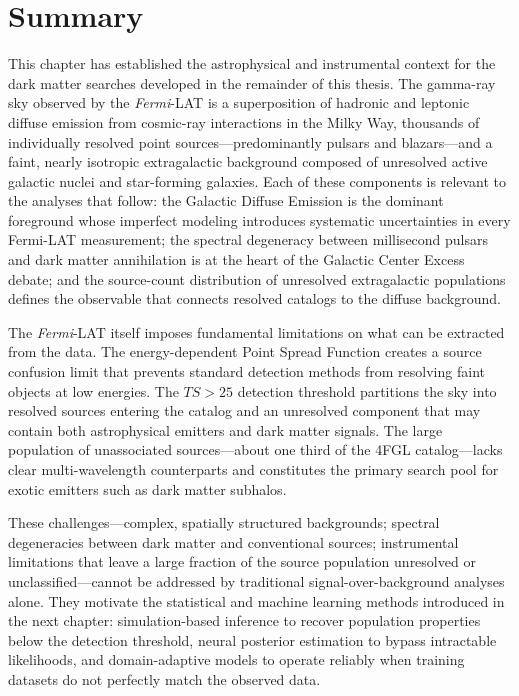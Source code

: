 
\section{Summary}
\label{sec:ch2_summary}

This chapter has established the astrophysical and instrumental context for the dark matter searches developed in the remainder of this thesis.
The gamma-ray sky observed by the \textit{Fermi}-LAT is a superposition of hadronic and leptonic diffuse emission from cosmic-ray interactions in the Milky Way, thousands of individually resolved point sources---predominantly pulsars and blazars---and a faint, nearly isotropic extragalactic background composed of unresolved active galactic nuclei and star-forming galaxies.
Each of these components is relevant to the analyses that follow: the Galactic Diffuse Emission is the dominant foreground whose imperfect modeling introduces systematic uncertainties in every Fermi-LAT measurement; the spectral degeneracy between millisecond pulsars and dark matter annihilation is at the heart of the Galactic Center Excess debate; and the source-count distribution of unresolved extragalactic populations defines the observable that connects resolved catalogs to the diffuse background.

The \textit{Fermi}-LAT itself imposes fundamental limitations on what can be extracted from the data.
The energy-dependent Point Spread Function creates a source confusion limit that prevents standard detection methods from resolving faint objects at low energies.
The $TS > 25$ detection threshold partitions the sky into resolved sources entering the catalog and an unresolved component that may contain both astrophysical emitters and dark matter signals.
The large population of unassociated sources---about one third of the 4FGL catalog---lacks clear multi-wavelength counterparts and constitutes the primary search pool for exotic emitters such as dark matter subhalos.

These challenges---complex, spatially structured backgrounds; spectral degeneracies between dark matter and conventional sources; instrumental limitations that leave a large fraction of the source population unresolved or unclassified---cannot be addressed by traditional signal-over-background analyses alone.
They motivate the statistical and machine learning methods introduced in the next chapter: simulation-based inference to recover population properties below the detection threshold, neural posterior estimation to bypass intractable likelihoods, and domain-adaptive models to operate reliably when training datasets do not perfectly match the observed data.

